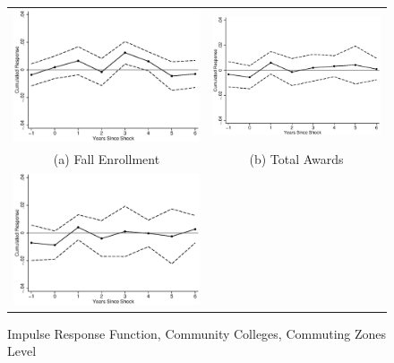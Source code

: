 \clearpage

\begin{figure}[h]\centering\caption{Impulse Response Function, Community Colleges, Commuting Zones Level}\begin{tabular}{cc}
\includegraphics[scale=0.6]{./figures/cumresp_cz_tef_tot47}&
\includegraphics[scale=0.6]{./figures/cumresp_cz_aw_tot47}\\
(a) Fall Enrollment&(b) Total Awards\\
\includegraphics[scale=0.6]{./figures/cumresp_cz_aw_aa47}&

\end{tabular}
\end{figure}
